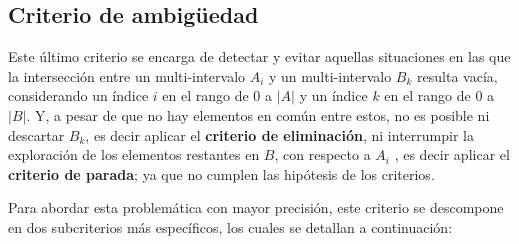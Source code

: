 
\subsection{Criterio de ambigüedad}

Este último criterio se encarga de detectar y evitar aquellas situaciones en las que la intersección entre un multi-intervalo $A_i$ y un multi-intervalo $B_k$ resulta vacía, considerando un índice $i$ en el rango de $0$ a $|A|$ y un índice $k$ en el rango de $0$ a $|B|$. Y, a pesar de que no hay elementos en común entre estos, no es posible ni descartar $B_k$, es decir aplicar el \textbf{criterio de eliminación}, ni interrumpir la exploración de los elementos restantes en $B$, con respecto a $A_i$ , es decir aplicar el \textbf{criterio de parada}; ya que no cumplen las hipótesis de los criterios.

Para abordar esta problemática con mayor precisión, este criterio se descompone en dos subcriterios más específicos, los cuales se detallan a continuación:

